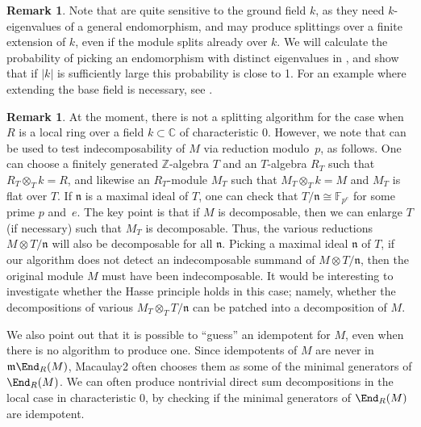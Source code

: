 \documentclass[12pt]{amsart}
\let\bar\overline
\def\FF{\mathbb F}
\def\ZZ{\mathbb Z}
\def\CC{\mathbb C}
\def\n{\mathfrak n}
\def\m{\mathfrak m}
\theoremstyle{theorem}
\numberwithin{thm}{section}
\theoremstyle{definition}
\newtheorem{rem}[thm]{Remark}
\begin{document}
\begin{rem}\label{rem:extension}
  Note that  are quite sensitive to the ground field $k$, as they need $k$-eigenvalues of a general endomorphism, and may produce splittings over a finite extension of $k$, even if the module splits already over $k$. 
We will calculate the probability of picking an endomorphism with distinct eigenvalues in , and show that if $|k|$ is sufficiently large this probability is close to 1.
  For an example where extending the base field is necessary, see .
\end{rem}


\begin{rem}\label{rem:char}
  At the moment, there is not a splitting algorithm for the case when $R$ is a local ring over a field $k\subset\CC$ of characteristic 0. However, we note that  can be used to test indecomposability of $M$ via reduction modulo~$p$, as follows.
  One can choose a finitely generated $\ZZ$-algebra $T$ and an $T$-algebra $R_T$ such that $R_T\otimes_T k = R$, and likewise an $R_T$-module $M_T$ such that $M_T\otimes _T k = M$ and $M_T$ is flat over $T$. If $\n$ is a maximal ideal of $T$, one can check that $T/\n \cong \FF_{p^e}$ for some prime $p$ and~$e$.
  The key point is that if $M$ is decomposable, then we can enlarge $T$ (if necessary) such that $M_T$ is decomposable. Thus, the various reductions  $M\otimes T/\n$ will also be decomposable for all $\n$.
  Picking a maximal ideal $\n$ of $T$, if our algorithm does not detect an indecomposable summand of $M\otimes T/\n$, then the original module $M$ must have been indecomposable.
  It would be interesting to investigate whether the Hasse principle holds in this case; namely, whether the decompositions of various $M_T\otimes_T T/\n$ can be patched into a decomposition of $M$.

  We also point out that it is possible to ``guess'' an idempotent for $M$, even when there is no algorithm to produce one.  Since idempotents of $M$ are never in $\m\End_R (M)$, Macaulay2 often chooses them as some of the minimal generators of $\End_R(M)$. We can often produce nontrivial direct sum decompositions in the local case in characteristic 0,
by checking if the minimal generators of $\End_R(M)$ are idempotent.
\end{rem}
\end{document}
